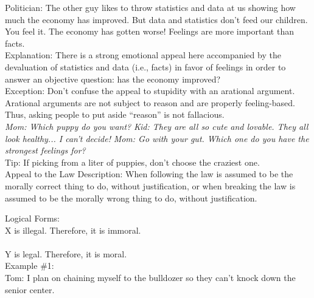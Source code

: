 \documentclass[a4paper,12pt,single,pdftex]{scrbook}
\begin{document}
    
      Politician: The other guy likes to throw statistics and data at us showing how much the economy has improved. But data and statistics don't feed our children. You feel it. The economy has gotten worse! Feelings are more important than facts.
    \\

    
      Explanation: There is a strong emotional appeal here accompanied by the devaluation of statistics and data (i.e., facts) in favor of feelings in order to answer an objective question: has the economy improved?
    \\

    
      Exception: Don’t confuse the appeal to stupidity with an arational argument. Arational arguments are not subject to reason and are properly feeling-based. Thus, asking people to put aside “reason” is not fallacious.
    \\

    
      {\em Mom: Which puppy do you want?} \newline
{\em Kid: They are all so cute and lovable. They all look healthy... I can’t decide!} \newline
{\em Mom: Go with your gut. Which one do you have the strongest feelings for?}
    \\

    
      Tip: If picking from a liter of puppies, don’t choose the craziest one.
    \\

  

Appeal to the Law
    Description: When following the law is assumed to be the morally correct thing to do, without justification, or when breaking the law is assumed to be the morally wrong thing to do, without justification.

    
      Logical Forms:
    \\

    
      X is illegal. Therefore, it is immoral.
    \\

    
      
    \\

    
      Y is legal. Therefore, it is moral.
    \\

    
      Example \#1:
    \\

    
      Tom: I plan on chaining myself to the bulldozer so they can't knock down the senior center.
    \\
\end{document}
